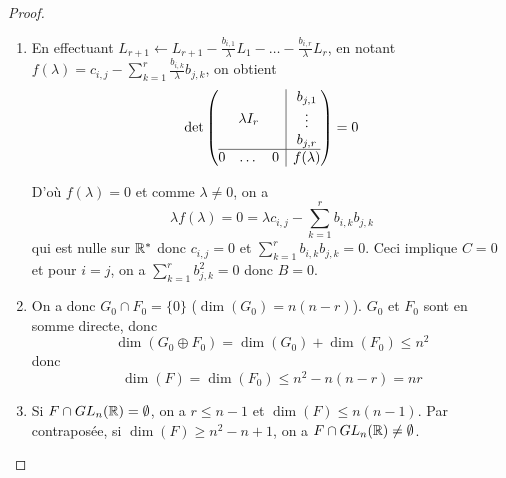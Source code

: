 \documentclass[12pt]{article}
\begin{document}
\begin{proof}
\begin{enumerate}
        \item En effectuant $L_{r+1}\leftarrow L_{r+1}-\frac{b_{i,1}}{\lambda}L_{1}-\dots-\frac{b_{i,r}}{\lambda}L_{r}$, en notant $f(\lambda)=c_{i,j}-\sum_{k=1}^{r}\frac{b_{i,k}}{\lambda}b_{j,k}$, on obtient 
        \begin{equation}
            \det\left(
				\begin{array}{@{}c|c@{}}
				\lambda
				I_{r} &
				\begin{matrix}
				b_{j,1}\\
						\vdots\\
						b_{j,r}
						\end{matrix}
						\\
					\hline
					\begin{matrix}
						0 &
						\dots
						& 0
						\end{matrix}
						& f(\lambda)
				\end{array}
			\right)=0
        \end{equation}

        D'où $f(\lambda)=0$ et comme $\lambda\neq0$, on a
        \begin{equation}
            \lambda f(\lambda)=0=\lambda c_{i,j}-\sum_{k=1}^{r}b_{i,k}b_{j,k}
        \end{equation}
        qui est nulle sur $\mathbb{R}^{*}$ donc $c_{i,j}=0$ et $\sum_{k=1}^{r}b_{i,k}b_{j,k}=0$. Ceci implique $C=0$ et pour $i=j$, on a $\sum_{k=1}^{r}b_{j,k}^{2}=0$ donc $B=0$.

        \item On a donc $G_{0}\cap F_{0}=\lbrace0\rbrace$ ($\dim(G_{0})=n(n-r)$). $G_{0}$ et $F_{0}$ sont en somme directe, donc 
        \begin{equation}
            \dim(G_{0}\oplus F_{0})=\dim(G_{0})+\dim(F_{0})\leqslant n^{2}
        \end{equation}
        donc 
        \begin{equation}
            \boxed{\dim(F)=\dim(F_{0})\leqslant n^{2}-n(n-r)=nr}
        \end{equation}

        \item Si $F\cap GL_{n}(\mathbb{R})=\emptyset$, on a $r\leqslant n-1$ et $\dim(F)\leqslant n(n-1)$. Par contraposée, si $\dim(F)\geqslant n^{2}-n+1$, on a $F\cap GL_{n}(\mathbb{R})\neq\emptyset$.
        

\end{enumerate}
\end{proof}
\end{document}
